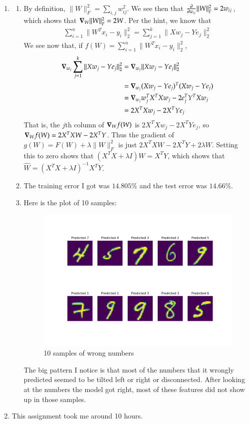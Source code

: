 \documentclass[12pt]{article}
\theoremstyle{definitionstyle}
\newcommand{\mg}[1]{\| #1 \|}
\begin{document}
\begin{enumerate}[leftmargin=\labelsep]
        \item \begin{enumerate}
            \item By definition, $\mg{W}_F^2 = \sum_{i,j} w_{ij}^2$. We see then that $\pdv{w_{ij}} \mg{W}_F^2 = 2w_{ij}$, which shows that $\grad_W \mg{W}_F^2 = 2W$. Per the hint, we know that 
            \begin{align*}
                \sum_{i=1}^n \mg{W^Tx_i - y_i}_2^2 = \sum_{j=1}^k \mg{Xw_j-Ye_j}_2^2
            \end{align*}
            We see now that, if $f(W) = \sum_{i=1}^n \mg{W^Tx_i-y_i}_2^2$,
            \begin{align*}
                \grad_{w_j} \sum_{j=1}^{k}\mg{Xw_j-Ye_j}_2^2 &= \grad_{w_j} \mg{Xw_j-Ye_j}_2^2 \\
                &= \grad_{w_j} (Xw_j-Ye_j)^T(Xw_j-Ye_j) \\
                &= \grad_{w_j} w_j^TX^TXw_j - 2e_j^TY^TXw_j \\
                &= 2X^TXw_j - 2X^TYe_j
            \end{align*}
            That is, the $j$th column of $\grad_W f(W)$ is $2X^TXw_j - 2X^TYe_j$, so $\grad_W f(W) = 2X^TXW - 2X^TY$. Thus the gradient of $g(W) = F(W) + \lambda \mg{W}_F^2$ is just $2X^TXW - 2X^TY + 2\lambda W$. Setting this to zero shows that $(X^TX+\lambda I)W = X^TY$, which shows that $\widehat{W} = (X^TX+\lambda I)^{-1}X^TY$.

            \item The training error I got was $14.805\%$ and the test error was $14.66\%$.
            \item Here is the plot of 10 samples:
            \begin{figure}[H]
                \centering
                \includegraphics[width=\textwidth]{10_wrong_numbers.png}
                \caption{10 samples of wrong numbers}
                \label{fig:10_wrong_numbers}
            \end{figure}
            The big pattern I notice is that most of the numbers that it wrongly predicted seemed to be tilted left or right or disconnected. After looking at the numbers the model got right, most of these features did not show up in those samples.
        \end{enumerate}

        \item This assignment took me around 10 hours.
    \end{enumerate}
\end{document}
